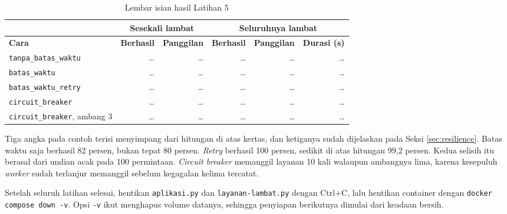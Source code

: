 \begin{table}[!htb]
  \centering
  \caption{Lembar isian hasil Latihan 5}
  \label{tab:c4-lat5-hasil}
  \begin{tabularx}{\textwidth}{Xrrrrr}
    \hline
     & \multicolumn{2}{c}{\textbf{Sesekali lambat}} & \multicolumn{3}{c}{\textbf{Seluruhnya lambat}} \\
    \hline
    \textbf{Cara} & \textbf{Berhasil} & \textbf{Panggilan} & \textbf{Berhasil} & \textbf{Panggilan} & \textbf{Durasi (s)} \\
    \hline
    \texttt{tanpa\_batas\_waktu} & \dots & \dots & \dots & \dots & \dots \\
    \hline
    \texttt{batas\_waktu} & \dots & \dots & \dots & \dots & \dots \\
    \hline
    \texttt{batas\_waktu\_retry} & \dots & \dots & \dots & \dots & \dots \\
    \hline
    \texttt{circuit\_breaker} & \dots & \dots & \dots & \dots & \dots \\
    \hline
    \texttt{circuit\_breaker}, ambang 3 & \dots & \dots & \dots & \dots & \dots \\
    \hline
  \end{tabularx}
\end{table}

Tiga angka pada contoh terisi menyimpang dari hitungan di atas kertas, dan
ketiganya sudah dijelaskan pada Seksi \ref{sec:resilience}. Batas waktu saja
berhasil 82 persen, bukan tepat 80 persen. \textit{Retry} berhasil 100 persen,
sedikit di atas hitungan 99,2 persen. Kedua selisih itu berasal dari undian
acak pada 100 permintaan. \textit{Circuit breaker} memanggil layanan 10 kali walaupun
ambangnya lima,
karena kesepuluh \textit{worker} sudah terlanjur memanggil sebelum kegagalan kelima
tercatat.

Setelah seluruh latihan selesai, hentikan \texttt{aplikasi.py} dan
\texttt{layanan-lambat.py} dengan Ctrl+C, lalu hentikan container dengan
\texttt{docker compose down -v}. Opsi \texttt{-v} ikut menghapus volume
datanya, sehingga penyiapan berikutnya dimulai dari keadaan bersih.
